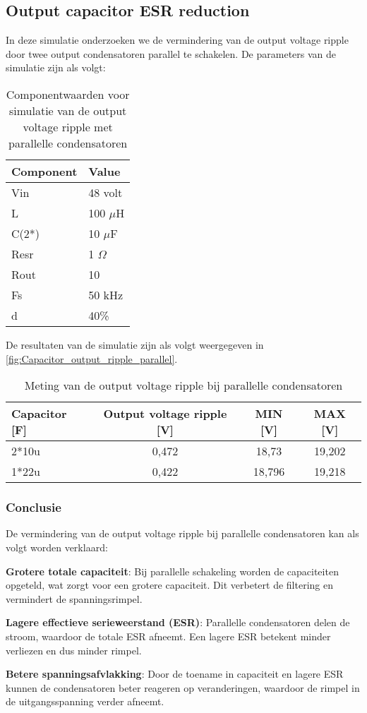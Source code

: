 \subsection{Output capacitor ESR reduction}
In deze simulatie onderzoeken we de vermindering van de output voltage ripple door twee output condensatoren parallel te schakelen. De parameters van de simulatie zijn als volgt:
\begin{table}[h!]
\centering
\begin{tabular}{|l|l|}
\hline
\textbf{Component} & \textbf{Value} \\
\hline
Vin  & 48 volt \\
L    & 100 $\mu$H \\
C(2*) & 10 $\mu$F \\
Resr & 1 $\Omega$ \\
Rout & 10 \\
Fs   & 50 kHz \\
d    & 40\% \\
\hline
\end{tabular}
\caption{Componentwaarden voor simulatie van de output voltage ripple met parallelle condensatoren}
\label{fig:Componentwaarden_parallel_condensatoren}
\end{table}

De resultaten van de simulatie zijn als volgt weergegeven in \autoref{fig:Capacitor_output_ripple_parallel}.
\begin{table}[h!]
\centering
\begin{tabular}{|l|c|c|c|}
\hline
\textbf{Capacitor [F]} & \textbf{Output voltage ripple [V]} & \textbf{MIN [V]} & \textbf{MAX [V]} \\
\hline
2*10u   & 0,472  & 18,73  & 19,202 \\
1*22u   & 0,422  & 18,796 & 19,218 \\
\hline
\end{tabular}
\caption{Meting van de output voltage ripple bij parallelle condensatoren}
\label{fig:Capacitor_output_ripple_parallel}
\end{table}

\subsubsection{Conclusie}
De vermindering van de output voltage ripple bij parallelle condensatoren kan als volgt worden verklaard:

\textbf{Grotere totale capaciteit}: Bij parallelle schakeling worden de capaciteiten opgeteld, wat zorgt voor een grotere capaciteit. Dit verbetert de filtering en vermindert de spanningsrimpel.

\textbf{Lagere effectieve serieweerstand (ESR)}: Parallelle condensatoren delen de stroom, waardoor de totale ESR afneemt. Een lagere ESR betekent minder verliezen en dus minder rimpel.

\textbf{Betere spanningsafvlakking}: Door de toename in capaciteit en lagere ESR kunnen de condensatoren beter reageren op veranderingen, waardoor de rimpel in de uitgangsspanning verder afneemt.